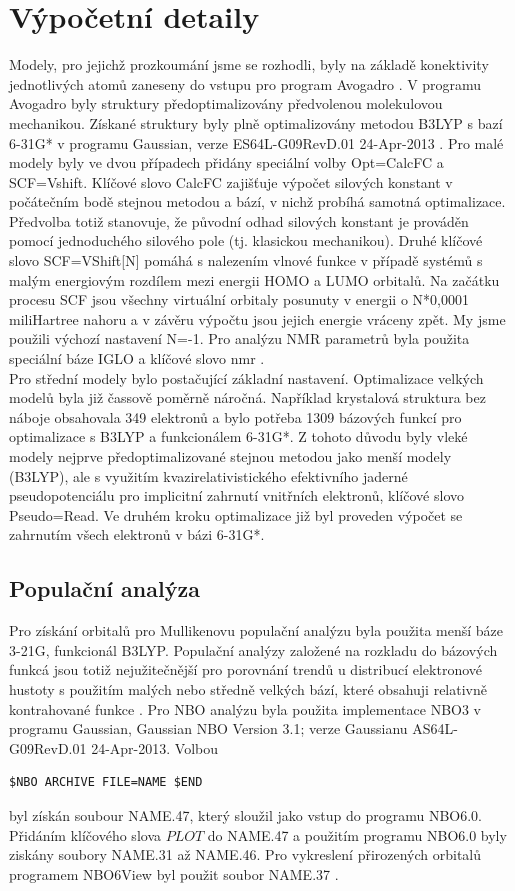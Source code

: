 \documentclass[
  digital, %
  table,   %
  lof,     %
  lot,     %
  oneside,
]{fithesis3}
\begin{document}
\section{Výpočetní detaily}
Modely, pro jejichž prozkoumání jsme se rozhodli, byly na základě konektivity jednotlivých atomů zaneseny do vstupu pro program Avogadro \cite{Avogadro}. V programu Avogadro byly struktury předoptimalizovány předvolenou molekulovou mechanikou. Získané struktury byly plně optimalizovány metodou B3LYP \cite{b3lyp} s bazí 6-31G* v programu Gaussian, verze ES64L-G09RevD.01 24-Apr-2013  \cite{g09}. Pro malé modely byly ve dvou případech přidány speciální volby Opt=CalcFC a SCF=Vshift. Klíčové slovo CalcFC zajišťuje výpočet silových konstant v počátečním bodě stejnou metodou a bází, v nichž probíhá samotná optimalizace. Předvolba totiž stanovuje, že původní odhad silových konstant je prováděn pomocí jednoduchého silového pole (tj. klasickou mechanikou). Druhé klíčové slovo SCF=VShift[N] pomáhá s nalezením vlnové funkce v případě systémů s malým energiovým rozdílem mezi energii HOMO a LUMO orbitalů. Na začátku procesu SCF jsou všechny virtuální orbitaly posunuty v energii o N*0,0001 miliHartree nahoru a v závěru výpočtu jsou jejich energie vráceny zpět. My jsme použili výchozí nastavení N=-1. Pro analýzu NMR parametrů byla použita speciální báze IGLO \cite{iglo} a klíčové slovo nmr \cite{g09}. \\
Pro střední modely bylo postačující základní nastavení. Optimalizace velkých modelů byla již čassově poměrně náročná. Například krystalová struktura bez náboje obsahovala 349 elektronů a bylo potřeba 1309 bázových funkcí pro optimalizace s B3LYP a funkcionálem 6-31G*. Z tohoto důvodu byly vleké modely nejprve předoptimalizované stejnou metodou jako menší modely (B3LYP), ale s využitím kvazirelativistického efektivního jaderné pseudopotenciálu pro implicitní zahrnutí vnitřních elektronů, klíčové slovo Pseudo=Read. Ve druhém kroku optimalizace již byl proveden výpočet se zahrnutím všech elektronů v bázi 6-31G*.\\
\subsection{Populační analýza}
Pro získání orbitalů pro Mullikenovu populační analýzu byla použita menší báze 3-21G, funkcionál B3LYP. Populační analýzy založené na rozkladu do bázových funkcá jsou totiž nejužitečnější pro porovnání trendů u distribucí elektronové hustoty s použitím malých nebo středně velkých bází, které obsahuji relativně kontrahované funkce \cite{jensen2007introduction}.
 Pro NBO analýzu byla použita implementace NBO3 v programu Gaussian, Gaussian NBO Version 3.1; verze Gaussianu AS64L-G09RevD.01 24-Apr-2013. Volbou  \begin{lstlisting}[frame=single]
 $NBO ARCHIVE FILE=NAME $END
  \end{lstlisting}
byl získán soubour NAME.47, který sloužil jako vstup do programu NBO6.0. Přidáním klíčového slova $PLOT$ do NAME.47 a použitím programu NBO6.0 byly ziskány soubory NAME.31 až NAME.46. Pro vykreslení přirozených orbitalů programem NBO6View byl použit soubor NAME.37 \cite{doi:10.1002/jcc.23266}.
\end{document}
